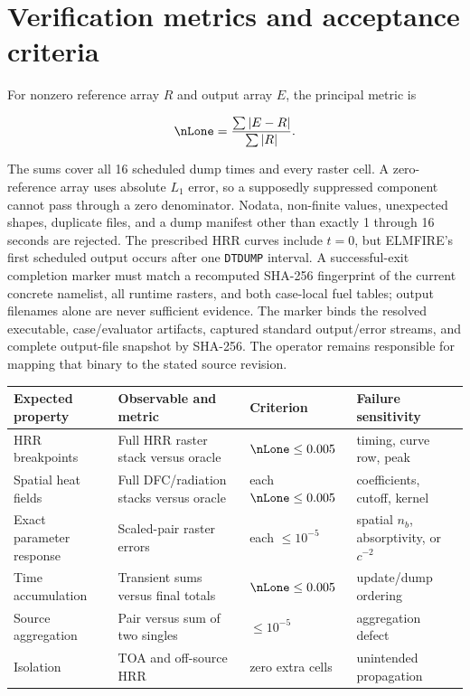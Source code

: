 \section{Verification metrics and acceptance criteria}

For nonzero reference array $R$ and output array $E$, the principal metric is

\begin{equation}
 \nLone=\frac{\sum |E-R|}{\sum |R|}.
\end{equation}

The sums cover all 16 scheduled dump times and every raster cell.  A zero-reference
array uses absolute $L_1$ error, so a supposedly suppressed component cannot
pass through a zero denominator.  Nodata, non-finite values, unexpected
shapes, duplicate files, and a dump manifest other than exactly 1 through
16 seconds are rejected.  The prescribed HRR curves include $t=0$, but
ELMFIRE's first scheduled output occurs after one \texttt{DTDUMP} interval.
A successful-exit completion marker must match a
recomputed SHA-256 fingerprint of the current concrete namelist, all runtime
rasters, and both case-local fuel tables; output filenames alone are never
sufficient evidence.  The marker binds the resolved executable,
case/evaluator artifacts, captured standard output/error streams, and complete
output-file snapshot by SHA-256.  The operator
remains responsible for mapping that binary to the stated source revision.

\begin{center}


\begin{longtable}{@{}P{0.22\textwidth}P{0.30\textwidth} P{0.17\textwidth}P{0.17\textwidth}@{}}
\toprule
Expected property & Observable and metric & Criterion & Failure sensitivity\\
\midrule
HRR breakpoints & Full HRR raster stack versus oracle & $\nLone\le0.005$ & timing, curve row, peak\\
Spatial heat fields & Full DFC/radiation stacks versus oracle & each $\nLone\le0.005$ & coefficients, cutoff, kernel\\
Exact parameter response & Scaled-pair raster errors & each $\le10^{-5}$ & spatial $n_b$, absorptivity, or $c^{-2}$\\
Time accumulation & Transient sums versus final totals & $\nLone\le0.005$ & update/dump ordering\\
Source aggregation & Pair versus sum of two singles & $\le10^{-5}$ & aggregation defect\\
Isolation & TOA and off-source HRR & zero extra cells & unintended propagation\\
\bottomrule
\end{longtable}
\end{center}


